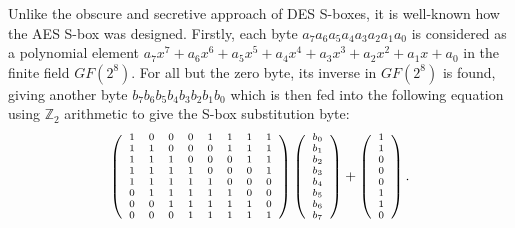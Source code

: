 Unlike the obscure and secretive approach of DES S-boxes, it is well-known
how the AES S-box was designed. Firstly, each byte $a_7a_6a_5a_4a_3a_2a_1a_0$
is considered as a polynomial element
$a_7x^7+a_6x^6+a_5x^5+a_4x^4+a_3x^3+a_2x^2+a_1x+a_0$
in the finite field $GF(2^8)$. For all but the zero byte, its inverse
in $GF(2^8)$ is found, giving another byte $b_7b_6b_5b_4b_3b_2b_1b_0$ which
is then fed into the following equation using $\mathbb{Z}_2$ arithmetic
to give the S-box substitution byte:
\begin{displaymath}\begin{scriptsize}
  \left(\begin{array}{cccccccc}
    1&0&0&0&1&1&1&1\\
    1&1&0&0&0&1&1&1\\
    1&1&1&0&0&0&1&1\\
    1&1&1&1&0&0&0&1\\
    1&1&1&1&1&0&0&0\\
    0&1&1&1&1&1&0&0\\
    0&0&1&1&1&1&1&0\\
    0&0&0&1&1&1&1&1
  \end{array}\right)
  \left(\begin{array}{c}
    b_0\\b_1\\b_2\\b_3\\b_4\\b_5\\b_6\\b_7
  \end{array}\right)
  +
  \left(\begin{array}{c}
    1\\1\\0\\0\\0\\1\\1\\0
  \end{array}\right).
\end{scriptsize}\end{displaymath}
